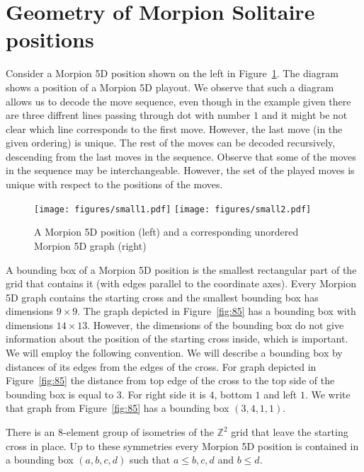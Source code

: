 \section{Geometry of Morpion Solitaire positions}


Consider a Morpion 5D position shown on the left in Figure~\ref{fig:small}. 
The diagram shows a position of a Morpion 5D playout.
We observe that such a diagram allows us to decode the move sequence,
  even though in the example given there are three diffrent lines passing through dot with number $1$
  and it might be not clear which line corresponds to the first move.
However, the last move (in the given ordering) is unique. 
The rest of the moves can be decoded recursively, descending from the last moves in the sequence.
Observe that some of the moves in the sequence may be interchangeable.
However, the set of the played moves is unique with respect to the positions of the moves.

\begin{figure}
    \texttt{[image: figures/small1.pdf]}
    \texttt{[image: figures/small2.pdf]}
    \caption{\label{fig:small}
      A Morpion 5D position (left) and a corresponding unordered Morpion 5D graph (right)
    }
\end{figure}

A bounding box of a Morpion 5D position is the smallest rectangular part of the grid that contains it 
  (with edges parallel to the coordinate axes).
Every Morpion 5D graph contains the starting cross and the smallest bounding box has dimensions $9 \times 9$.
The graph depicted in Figure~\ref{fig:85} has a bounding box with dimensions $14 \times 13$.
However, the dimensions of the bounding box do not give information about the position of the starting cross inside, which is important.
We will employ the following convention.
We will describe a bounding box by distances of its edges from the edges of the cross.
For graph depicted in Figure~\ref{fig:85} the distance from top edge of the cross to the top side of the bounding box is equal to $3$. For right side it is $4$, bottom $1$ and left $1$. 
We write that graph from Figure~\ref{fig:85} has a bounding box $(3,4,1,1)$.
  
There is an $8$-element group of isometries of the $\mathbb{Z}^2$ grid that leave the starting cross in place.
Up to these symmetries every Morpion 5D position is contained in a bounding box $(a,b,c,d)$ such that
  $a \leq b,c,d$ and $b \leq d$.

